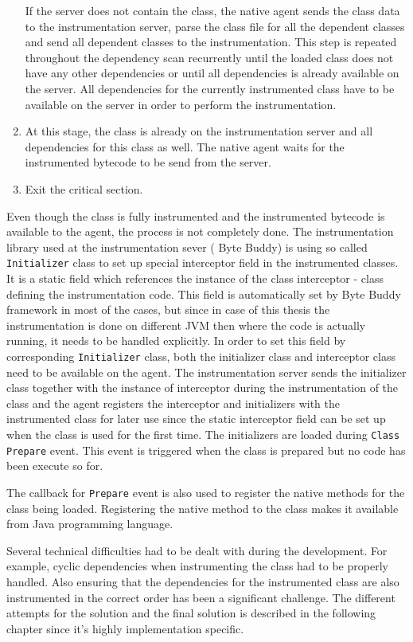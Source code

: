 \begin{enumerate}
	If the server does not contain the class, the native agent sends the class data to the instrumentation server, parse the class file for all the dependent classes and send all dependent classes to the instrumentation. This step is repeated throughout the dependency scan recurrently until the loaded class does not have any other dependencies or until all dependencies is already available on the server. All dependencies for the currently instrumented class have to be available on the server in order to perform the instrumentation.

	\item At this stage, the class is already on the instrumentation server and all dependencies for this class as well. The native agent waits for the instrumented bytecode to be send from the server. 
	\item Exit the critical section.
\end{enumerate}	
Even though the class is fully instrumented and the instrumented bytecode is available to the agent, the process is not completely done. The instrumentation library used at the instrumentation sever ( Byte Buddy) is using so called \texttt{Initializer} class to set up special interceptor field in the instrumented classes. It is a static field which references the instance of the class interceptor - class defining the instrumentation code. This field is automatically set by Byte Buddy framework in most of the cases, but since in case of this thesis the instrumentation is done on different JVM then where the code is actually running, it needs to be handled explicitly. In order to set this field by corresponding \texttt{Initializer} class, both the initializer class and interceptor class need to be available on the agent. The instrumentation server sends the initializer class together with the instance of interceptor during the instrumentation of the class and the agent registers the interceptor and initializers with the instrumented class for later use since the static interceptor field can be set up when the class is used for the first time. The initializers are loaded during  \texttt{Class Prepare} event. This event is triggered when the class is prepared but no code has been execute so for. 

The callback for \texttt{Prepare} event is also used to register the native methods for the class being loaded. Registering the native method to the class makes it available from Java programming language.

Several technical difficulties had to be dealt with during the development. For example,  cyclic dependencies when instrumenting the class had to be properly handled. Also ensuring that the dependencies for the instrumented class are also instrumented in the correct order has been a significant challenge. The different attempts for the solution and the final solution is described in the following chapter since it's highly implementation specific.
